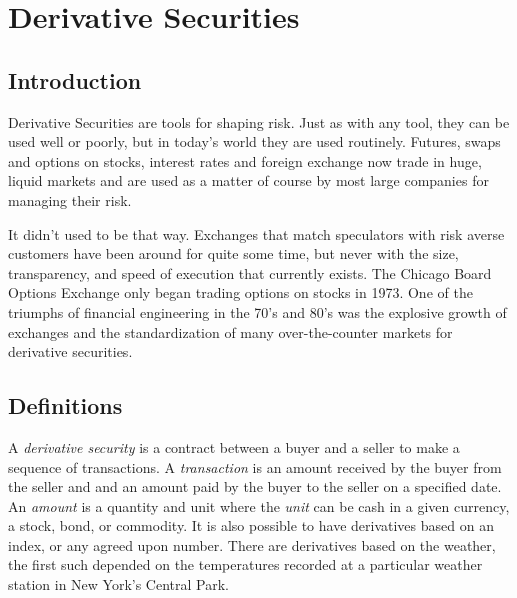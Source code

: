 \chapter{Derivative Securities} 
\label{ds} 



\section{Introduction}
%
Derivative Securities are tools for shaping risk. Just as with any tool,
they can be used well or poorly, but in today's world they are 
used routinely. Futures, swaps and options on stocks, interest
rates and foreign exchange now trade in huge, liquid markets and are
used as a matter of course by most large companies for managing
their risk.

It didn't used to be that way. Exchanges that match speculators with risk
averse customers have been around for quite some time, but never with
the size, transparency, and speed of execution that currently exists.
The Chicago Board Options Exchange only began trading options on stocks
in 1973.  One of the triumphs of financial engineering in the 70's and
80's was the explosive growth of exchanges and the standardization of many
over-the-counter markets for derivative securities.



\section{Definitions}
A {\em derivative security} is a contract between a buyer and
a seller to make a sequence of transactions.
A {\em transaction} is an amount received by the buyer from the seller
and and an amount paid by the buyer to the seller on a specified date.
An {\em amount} is a quantity and unit
where the {\em unit} can be cash in a given currency,
a stock, bond, or commodity. It is also possible to have
derivatives based on an index, or any agreed upon number.
There are derivatives based on the weather, the first such
depended on the temperatures recorded at a particular
weather station in New York's Central Park.

